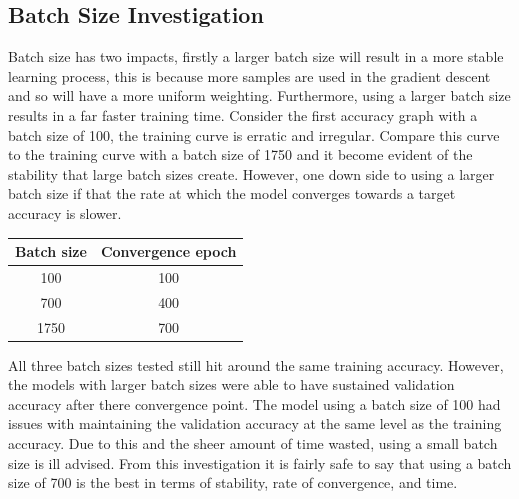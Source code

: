 \documentclass[12pt]{article}
\begin{document}
\subsection{Batch Size Investigation}
Batch size has two impacts, firstly a larger batch size will result in a more stable learning process, this
is because more samples are used in the gradient descent and so will have a more uniform weighting. Furthermore,
using a larger batch size results in a far faster training time. Consider the first accuracy graph with a batch
size of 100, the training curve is erratic and irregular. Compare this curve to the training curve with a batch size of
1750 and it become evident of the stability that large batch sizes create. However, one down side to
using a larger batch size if that the rate at which the model converges towards a target accuracy is slower.

\begin{center}
  \begin{tabular}{||c c||}
    \hline
    Batch size & Convergence epoch \\
    \hline\hline
    100        & 100               \\
    \hline
    700        & 400               \\
    \hline
    1750       & 700               \\
    \hline
  \end{tabular}
\end{center}

All three batch sizes tested still hit around the same training accuracy. However, the models with larger batch sizes
were able to have sustained validation accuracy after there convergence point. The model using a batch size of 100 had
issues with maintaining the validation accuracy at the same level as the training accuracy. Due to this and the sheer
amount of time wasted, using a small batch size is ill advised. From this investigation it is fairly safe to say that
using a batch size of 700 is the best in terms of stability, rate of convergence, and time.
\end{document}
